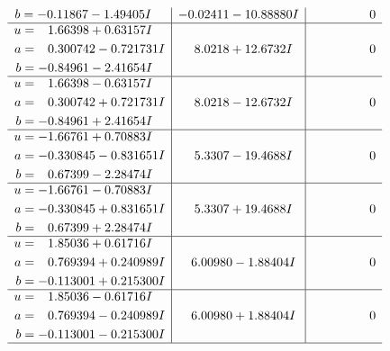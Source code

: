 \documentclass[1p]{elsarticle_modified}
\theoremstyle{definition}
\begin{document}
$$\begin{array}{c|c|c}
\begin{aligned}
b &= -0.11867 - 1.49405 I\end{aligned}
 & -0.02411 - 10.88880 I & \phantom{-0.000000 } 0 \\ \hline\begin{aligned}
u &= \phantom{-}1.66398 + 0.63157 I \\
a &= \phantom{-}0.300742 - 0.721731 I \\
b &= -0.84961 - 2.41654 I\end{aligned}
 & \phantom{-}8.0218 + 12.6732 I & \phantom{-0.000000 } 0 \\ \hline\begin{aligned}
u &= \phantom{-}1.66398 - 0.63157 I \\
a &= \phantom{-}0.300742 + 0.721731 I \\
b &= -0.84961 + 2.41654 I\end{aligned}
 & \phantom{-}8.0218 - 12.6732 I & \phantom{-0.000000 } 0 \\ \hline\begin{aligned}
u &= -1.66761 + 0.70883 I \\
a &= -0.330845 - 0.831651 I \\
b &= \phantom{-}0.67399 - 2.28474 I\end{aligned}
 & \phantom{-}5.3307 - 19.4688 I & \phantom{-0.000000 } 0 \\ \hline\begin{aligned}
u &= -1.66761 - 0.70883 I \\
a &= -0.330845 + 0.831651 I \\
b &= \phantom{-}0.67399 + 2.28474 I\end{aligned}
 & \phantom{-}5.3307 + 19.4688 I & \phantom{-0.000000 } 0 \\ \hline\begin{aligned}
u &= \phantom{-}1.85036 + 0.61716 I \\
a &= \phantom{-}0.769394 + 0.240989 I \\
b &= -0.113001 + 0.215300 I\end{aligned}
 & \phantom{-}6.00980 - 1.88404 I & \phantom{-0.000000 } 0 \\ \hline\begin{aligned}
u &= \phantom{-}1.85036 - 0.61716 I \\
a &= \phantom{-}0.769394 - 0.240989 I \\
b &= -0.113001 - 0.215300 I\end{aligned}
 & \phantom{-}6.00980 + 1.88404 I & \phantom{-0.000000 } 0\\
 \hline 
 \end{array}$$\newpage\newpage\renewcommand{\arraystretch}{1}
\end{document}
